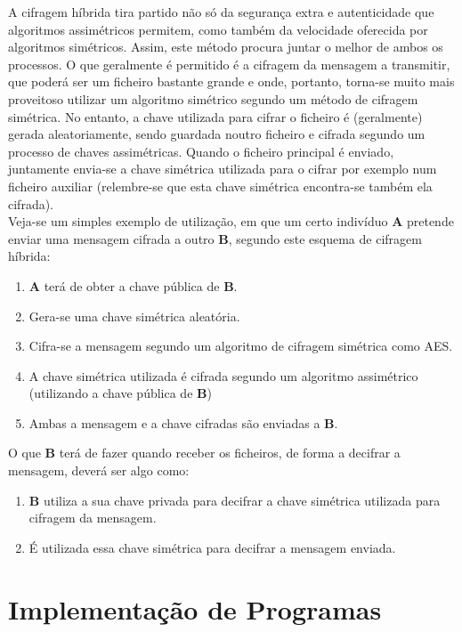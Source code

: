 \documentclass[a4paper,11pt,openright,oneside]{report}
\begin{document}
A cifragem híbrida tira partido não só da segurança extra e autenticidade que algoritmos assimétricos permitem, como também da velocidade oferecida por algoritmos simétricos. Assim, este método procura juntar o melhor de ambos os processos. O que geralmente é permitido é a cifragem da mensagem a transmitir, que poderá ser um ficheiro bastante grande e onde, portanto, torna-se muito mais proveitoso utilizar um algoritmo simétrico segundo um método de cifragem simétrica. No entanto, a chave utilizada para cifrar o ficheiro é (geralmente) gerada aleatoriamente, sendo guardada noutro ficheiro e cifrada segundo um processo de chaves assimétricas. Quando o ficheiro principal é enviado, juntamente envia-se a chave simétrica utilizada para o cifrar por exemplo num ficheiro auxiliar (relembre-se que esta chave simétrica encontra-se também ela cifrada).\\

Veja-se um simples exemplo de utilização, em que um certo indivíduo \textbf{A} pretende enviar uma mensagem cifrada a outro \textbf{B}, segundo este esquema de cifragem híbrida:

\begin{enumerate}
\item \textbf{A} terá de obter a chave pública de \textbf{B}.
\item Gera-se uma chave simétrica aleatória.
\item Cifra-se a mensagem segundo um algoritmo de cifragem simétrica como AES.
\item A chave simétrica utilizada é cifrada segundo um algoritmo assimétrico (utilizando a chave pública de \textbf{B})
\item Ambas a mensagem e a chave cifradas são enviadas a \textbf{B}.
\end{enumerate}

O que \textbf{B} terá de fazer quando receber os ficheiros, de forma a decifrar a mensagem, deverá ser algo como:

\begin{enumerate}
\item \textbf{B} utiliza a sua chave privada para decifrar a chave simétrica utilizada para cifragem da mensagem.
\item É utilizada essa chave simétrica para decifrar a mensagem enviada.
\end{enumerate}

\chapter{Implementação de Programas}
\label{chap.programas}
\end{document}

